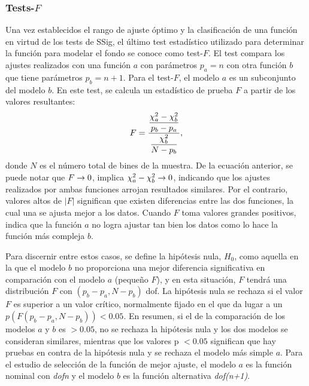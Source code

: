 \subsubsection{Tests-\(F\)}
\label{subsubsec:bkg:modeling:preparation:ftest}

Una vez establecidos el rango de ajuste óptimo y la clasificación de una función en virtud de los tests de \ac{SSig}, el último test estadístico utilizado para determinar la función para modelar el fondo se conoce como test-\(F\). El test compara los ajustes realizados con una función \(a\) con parámetros \(p_a = n\) con otra función \(b\) que tiene parámetros \(p_b = n+1\). Para el test-\(F\), el modelo \(a\) es un subconjunto del modelo \(b\). En este test, se calcula un estadístico de prueba \(F\) a partir de los valores \chisq resultantes:
\begin{equation}
    \label{eq:bkg:modeling:preparation:ftest:ftest}
    F = \frac{
        \displaystyle
        \frac{\chi^{2}_a - \chi^{2}_b}{p_b - p_a}
    }{
        \displaystyle
        \frac{\chi^{2}_b}{N - p_b}
    },
\end{equation}
donde \(N\) es el número total de bines de la muestra. De la ecuación anterior, se puede notar que \(F \rightarrow 0\), implica \(\chi^{2}_a - \chi^{2}_b \rightarrow 0\), indicando que los ajustes realizados por ambas funciones arrojan resultados similares. Por el contrario, valores altos de \(|F|\) significan que existen diferencias entre las dos funciones, la cual una se ajusta mejor a los datos.
Cuando \(F\) toma valores grandes positivos, indica que la función \(a\) no logra ajustar tan bien los datos como lo hace la función más compleja \(b\).



Para discernir entre estos casos, se define la hipótesis nula, \(H_0\), como aquella en la que el modelo \(b\) no proporciona una mejor diferencia significativa en comparación con el modelo \(a\) (pequeño \(F\)), y en esta situación, \(F\) tendrá una distribución \(F\) con \((p_b - p_a, N - p_b)\) \ac{dof}. La hipótesis nula se rechaza si el valor \(F\) es superior a un valor crítico, normalmente fijado en el que da lugar a un \(p\left(F(p_b-p_a, N-p_b)\right)<0.05\). En resumen, si el \pval de la comparación de los modelos \(a\) y \(b\) es \(>0.05\), no se rechaza la hipótesis nula y los dos modelos se consideran similares, mientras que los valores p \(<0.05\) significan que hay pruebas en contra de la hipótesis nula y se rechaza el modelo más simple \(a\).
Para el estudio de selección de la función de mejor ajuste, el modelo \(a\) es la función nominal con \textit{dofn} y el modelo \(b\) es la función alternativa \textit{dof(n+1)}.

